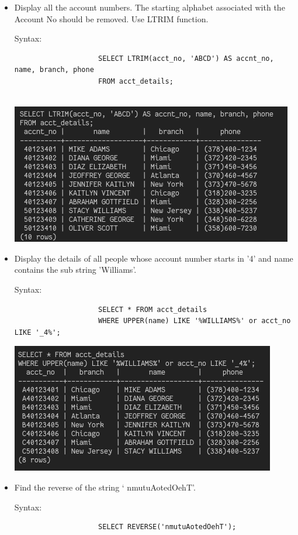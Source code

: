 \documentclass[13pt,oneside]{book}
\begin{document}
\begin{itemize}
					
					\item
					Display all the account numbers. The starting alphabet associated with the
					 Account No should be removed. Use LTRIM function.
					 
					Syntax:
					\begin{verbatim}
					SELECT LTRIM(acct_no, 'ABCD') AS accnt_no, name, branch, phone
					FROM acct_details;
					
					\end{verbatim}
					\includegraphics[]{img/p6/ss11.png}
					
					
					\item
					Display the details of all people whose account number starts in '4’ and name
					 contains the sub string 'Williams’.
					
					Syntax:
					\begin{verbatim}
					SELECT * FROM acct_details
					WHERE UPPER(name) LIKE '%WILLIAMS%' or acct_no LIKE '_4%';
					\end{verbatim}
					\includegraphics[]{img/p6/ss12.png}
					
					\item
					Find the reverse of the string ‘ nmutuAotedOehT’.
					 
					Syntax:
					\begin{verbatim}
					SELECT REVERSE('nmutuAotedOehT');
					

\end{verbatim}
\end{itemize}
\end{document}
